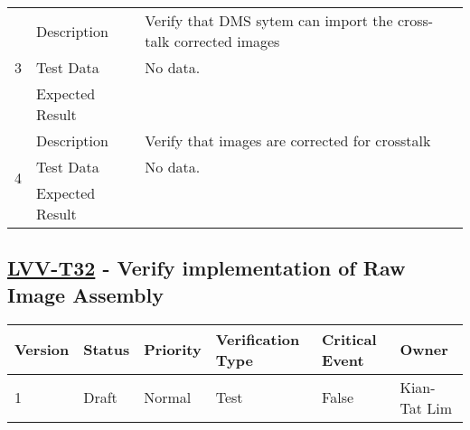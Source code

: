 \begin{longtable}[]{p{1.3cm}p{2cm}p{13cm}}
            \multirow{3}{*}{ 3 } & Description &
            \begin{minipage}[t]{13cm}{\footnotesize
            Verify that DMS sytem can import the cross-talk corrected images

            \vspace{\dp0}
            } \end{minipage} \\ \cline{2-3}
            & Test Data &
            \begin{minipage}[t]{13cm}{\footnotesize
                No data.
                \vspace{\dp0}
            } \end{minipage} \\ \cline{2-3}
            & Expected Result &
        \\ \midrule

            \multirow{3}{*}{ 4 } & Description &
            \begin{minipage}[t]{13cm}{\footnotesize
            Verify that images are corrected for crosstalk

            \vspace{\dp0}
            } \end{minipage} \\ \cline{2-3}
            & Test Data &
            \begin{minipage}[t]{13cm}{\footnotesize
                No data.
                \vspace{\dp0}
            } \end{minipage} \\ \cline{2-3}
            & Expected Result &
        \\ \midrule
    \end{longtable}

\subsection{\href{https://jira.lsstcorp.org/secure/Tests.jspa\#/testCase/LVV-T32}{LVV-T32}
    - Verify implementation of Raw Image Assembly}\label{lvv-t32}

\begin{longtable}[]{llllll}
\toprule
Version & Status & Priority & Verification Type & Critical Event & Owner
\\\midrule
1 & Draft & Normal &
Test & False & Kian-Tat Lim
\\\bottomrule
\end{longtable}

